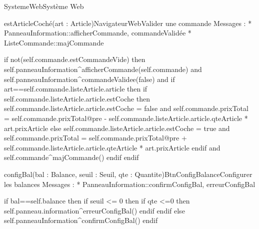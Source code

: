 \begin{OM}{SystemeWeb}{Système Web}
\begin{OMOperation}{estArticleCoché(art : Article)}{NavigateurWeb}{Valider une commande}
Messages :
* PanneauInformation::{afficherCommande, commandeValidée}
* ListeCommande::{majCommande}
\begin{OMPre}
\end{OMPre}
\begin{OMPost}
        if not(self.commande.estCommandeVide) then
                self.panneauInformation^afficherCommande(self.commande)
                and
                self.panneauInformation^commandeValidee(false)
                and
                if art==self.commande.listeArticle.article then
                        if self.commande.listeArticle.article.estCoche then
                                self.commande.listeArticle.article.estCoche = false
                                and
                                self.commande.prixTotal = self.commande.prixTotal@pre -
                                        self.commande.listeArticle.article.qteArticle * art.prixArticle
                        else
                                self.commande.listeArticle.article.estCoche = true
                                and
                                self.commande.prixTotal = self.commande.prixTotal@pre +
                                        self.commande.listeArticle.article.qteArticle * art.prixArticle
                        endif
                        and
                        self.commande^majCommande()
                endif
        endif
                    \end{OMPost}
\end{OMOperation}

\begin{OMOperation}{configBal(bal : Balance, seuil : Seuil, qte : Quantite)}{BtnConfigBalance}{Configurer les balances}
Messages :
* PanneauInformation::{confirmConfigBal, erreurConfigBal}
\begin{OMPre}
\end{OMPre}
\begin{OMPost}
        if bal==self.balance then
                if seuil <= 0 then
                        if qte <=0 then
                                self.panneau.information^erreurConfigBal()
                        endif
                endif
        else
                self.panneauInformation^confirmConfigBal()
        endif
            \end{OMPost}
\end{OMOperation}


\end{OM}
